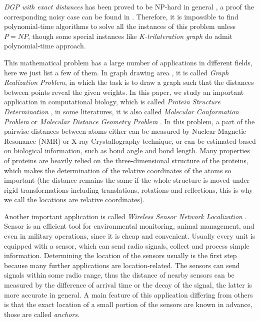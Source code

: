 \documentclass[a4paper,12pt]{article}
\begin{document}
\emph{DGP with exact distances} has been proved to be NP-hard in general \cite{Saxe1979}, a proof the corresponding noisy case can be found in \cite{Wu2008}. Therefore, it is impossible to find polynomial-time algorithms to solve all the instances of this problem unless $P=NP$, though some special instances like \emph{K-trilateration graph} \cite{Maculan2014} do admit polynomial-time approach.

This mathematical problem has a large number of applications in different fields, here we just list a few of them. In graph drawing area \cite{Gansner2005}, it is called \emph{Graph Realization Problem}, in which the task is to draw a graph such that the distances between points reveal the given weights.  
In this paper, we study an important application in computational biology, which is called \emph{Protein Structure Determination} \cite{Braun1987,Sit2011,Voller2013}, in some literatures, it is also called \emph{Molecular Conformation Problem} \cite{Crippen1988,Biswas2008,Fang2013} or \emph{Molecular Distance Geometry Problem} \cite{Dong2002,Dong2003,Carvalho2008}. In this problem, a part of the pairwise distances between atoms either can be measured by Nuclear Magnetic Resonance (NMR) or X-ray Crystallography technique, or can be estimated based on biological information, such as bond angle and bond length. Many properties of proteins are heavily relied on the three-dimensional structure of the proteins, which makes the determination of the relative coordinates of the atoms so important (the distance remains the same if the whole structure is moved under rigid transformations including translations, rotations and reflections, this is why we call the locations are relative coordinates).

Another important application is called \emph{Wireless Sensor Network Localization} \cite{Akyildiz2002,Chong2003,Mao2007,Yick2008}. Sensor is an efficient tool for environmental monitoring, animal management, and even in military operations, since it is cheap and convenient. Usually every unit is equipped with a sensor, which can send radio signals, collect and process simple information. Determining the location of the sensors usually is the first step because many further applications are location-related. The sensors can send signals within some radio range, thus the distance of nearby sensors can be measured by the difference of arrival time or the decay of the signal, the latter is more accurate in general. A main feature of this application differing from others is that the exact location of a small portion of the sensors are known in advance, those are called \emph{anchors}.
\end{document}
